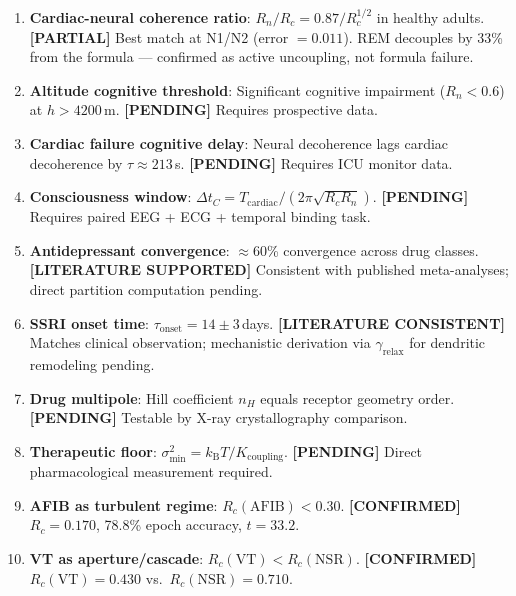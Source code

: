 \documentclass[12pt,a4paper]{article}
\theoremstyle{definition}
\newcommand{\kBT}{k_{\text{B}}T}
\begin{document}
\begin{enumerate}
\item \textbf{Cardiac-neural coherence ratio}: $R_n/R_c = 0.87/R_c^{1/2}$ in healthy adults.
  \textbf{[PARTIAL]} Best match at N1/N2 (error $= 0.011$). REM decouples by 33\%
  from the formula --- confirmed as active uncoupling, not formula failure.

\item \textbf{Altitude cognitive threshold}: Significant cognitive impairment
  ($R_n < 0.6$) at $h > 4200$\,m. \textbf{[PENDING]} Requires prospective data.

\item \textbf{Cardiac failure cognitive delay}: Neural decoherence lags cardiac
  decoherence by $\tau \approx 213$\,s. \textbf{[PENDING]} Requires ICU monitor data.

\item \textbf{Consciousness window}: $\Delta t_C = T_{\text{cardiac}}/(2\pi\sqrt{R_c R_n})$.
  \textbf{[PENDING]} Requires paired EEG + ECG + temporal binding task.

\item \textbf{Antidepressant convergence}: $\approx$60\% convergence across drug classes.
  \textbf{[LITERATURE SUPPORTED]} Consistent with published meta-analyses;
  direct partition computation pending.

\item \textbf{SSRI onset time}: $\tau_{\text{onset}} = 14\pm 3$\,days.
  \textbf{[LITERATURE CONSISTENT]} Matches clinical observation; mechanistic
  derivation via $\gamma_{\text{relax}}$ for dendritic remodeling pending.

\item \textbf{Drug multipole}: Hill coefficient $n_H$ equals receptor geometry order.
  \textbf{[PENDING]} Testable by X-ray crystallography comparison.

\item \textbf{Therapeutic floor}: $\sigma^2_{\min} = \kBT/K_{\text{coupling}}$.
  \textbf{[PENDING]} Direct pharmacological measurement required.

\item \textbf{AFIB as turbulent regime}: $R_c(\text{AFIB}) < 0.30$.
  \textbf{[CONFIRMED]} $R_c = 0.170$, 78.8\% epoch accuracy, $t = 33.2$.

\item \textbf{VT as aperture/cascade}: $R_c(\text{VT}) < R_c(\text{NSR})$.
  \textbf{[CONFIRMED]} $R_c(\text{VT}) = 0.430$ vs.\ $R_c(\text{NSR}) = 0.710$.


\end{enumerate}
\end{document}
